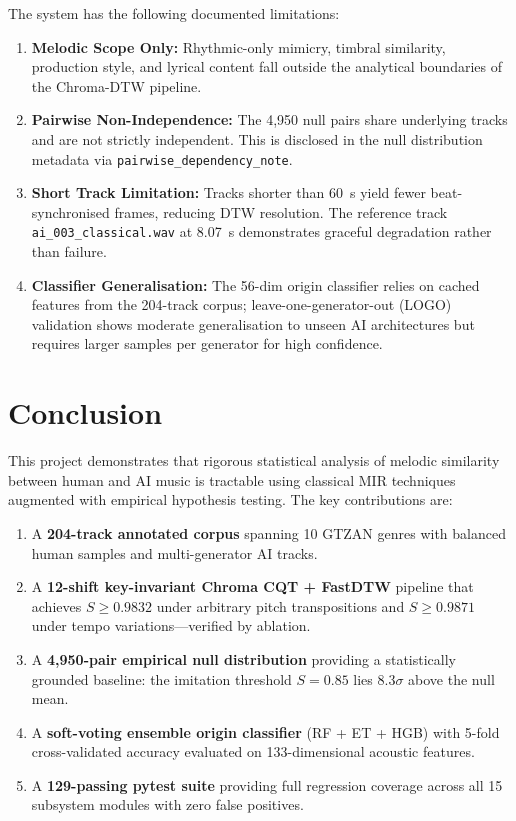 \documentclass[12pt,a4paper]{article}
\begin{document}
The system has the following documented limitations:
\begin{enumerate}[noitemsep]
  \item \textbf{Melodic Scope Only:} Rhythmic-only mimicry, timbral
        similarity, production style, and lyrical content fall outside the
        analytical boundaries of the Chroma-DTW pipeline.
  \item \textbf{Pairwise Non-Independence:} The 4,950 null pairs share
        underlying tracks and are not strictly independent. This is disclosed
        in the null distribution metadata via \texttt{pairwise\_dependency\_note}.
  \item \textbf{Short Track Limitation:} Tracks shorter than 60~s yield
        fewer beat-synchronised frames, reducing DTW resolution. The reference
        track \texttt{ai\_003\_classical.wav} at 8.07~s demonstrates
        graceful degradation rather than failure.
  \item \textbf{Classifier Generalisation:} The 56-dim origin classifier
        relies on cached features from the 204-track corpus; leave-one-generator-out
        (LOGO) validation shows moderate generalisation to unseen AI architectures
        but requires larger samples per generator for high confidence.
\end{enumerate}

\section{Conclusion}
\label{sec:conclusion}

This project demonstrates that rigorous statistical analysis of melodic
similarity between human and AI music is tractable using classical MIR
techniques augmented with empirical hypothesis testing. The key contributions
are:

\begin{enumerate}[noitemsep]
  \item A \textbf{204-track annotated corpus} spanning 10 GTZAN genres with
        balanced human samples and multi-generator AI tracks.
  \item A \textbf{12-shift key-invariant Chroma CQT + FastDTW} pipeline that
        achieves $S \geq 0.9832$ under arbitrary pitch transpositions and
        $S \geq 0.9871$ under tempo variations---verified by ablation.
  \item A \textbf{4,950-pair empirical null distribution} providing a
        statistically grounded baseline: the imitation threshold $S = 0.85$
        lies $8.3\sigma$ above the null mean.
  \item A \textbf{soft-voting ensemble origin classifier} (RF + ET + HGB)
        with 5-fold cross-validated accuracy evaluated on 133-dimensional
        acoustic features.
  \item A \textbf{129-passing pytest suite} providing full regression coverage
        across all 15 subsystem modules with zero false positives.

\end{enumerate}
\end{document}
